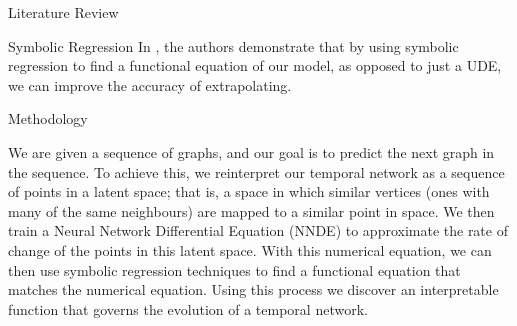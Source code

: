 \documentclass[12pt]{amsbook}
\begin{document}
\begin{chapter}{Literature Review}
\begin{section}{Symbolic Regression}
        In \cite{SciML_C_Rak}, the authors demonstrate that by using symbolic regression to find a functional equation of our model, as opposed to just a UDE, we can improve the accuracy of extrapolating.
    \end{section}
\end{chapter}

\begin{chapter}{Methodology}

        We are given a sequence of graphs, and our goal is to predict the next graph in the sequence. To achieve this, we reinterpret our temporal network as a sequence of points in a latent space; that is, a space in which similar vertices (ones with many of the same neighbours) are mapped to a similar point in space.
        We then train a Neural Network Differential Equation (NNDE) to approximate the rate of change of the points in this latent space. With this numerical equation, we can then use symbolic regression techniques to find a functional equation that matches the numerical equation. Using this process we discover an interpretable function that governs the evolution of a temporal network.

        \begin{figure}[H]
            \centering


\end{figure}
\end{chapter}
\end{document}
